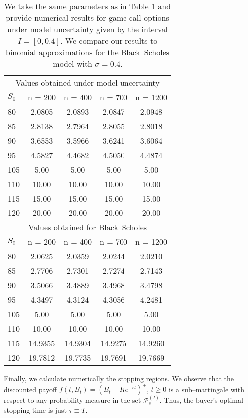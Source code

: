 \documentclass{amsart}
\numberwithin{equation}{section}
\begin{document}
\begin{table}
\begin{center}
\caption{
We take the same parameters as in Table 1
and provide numerical results for game call options under model uncertainty given by the
interval $I=[0,0.4]$. We compare our results to binomial approximations for the Black--Scholes model with $\sigma=0.4$.}
\begin{tabular}{lcccc}
\hline
\multicolumn{5}{c}{Values obtained under model uncertainty }\\
\cline{2-5}
$S_0$ & n = 200 & n = 400 & n = 700 & n = 1200  \\
\hline
80 & 2.0805  & 2.0893 & 2.0847 & 2.0948 \\
85 & 2.8138 & 2.7964 & 2.8055 &  2.8018    \\
90 & 3.6553 & 3.5966 & 3.6241 & 3.6064 \\
95 & 4.5827 & 4.4682 & 4.5050 & 4.4874  \\
105 & 5.00 & 5.00 & 5.00 & 5.00  \\
110 & 10.00 & 10.00 & 10.00 & 10.00 \\
115 & 15.00 & 15.00 & 15.00 & 15.00   \\
120 & 20.00 & 20.00 & 20.00 & 20.00   \\
\hline
\multicolumn{5}{c}{Values obtained for Black--Scholes  }\\
\cline{2-5}
$S_0$ & n = 200 & n = 400 & n = 700 & n = 1200  \\
\hline
80 & 2.0625 & 2.0359 & 2.0244& 2.0210 \\
85 & 2.7706 & 2.7301 & 2.7274 &  2.7143    \\
90 & 3.5066 & 3.4889 & 3.4968 & 3.4798 \\
95 & 4.3497 & 4.3124 & 4.3056 & 4.2481  \\
105 & 5.00 & 5.00 & 5.00 & 5.00  \\
110 & 10.00 & 10.00 & 10.00 & 10.00 \\
115 & 14.9355 & 14.9304 & 14.9275 & 14.9260   \\
120 & 19.7812 & 19.7735 & 19.7691 & 19.7669   \\
\end{tabular}
\end{center}
\end{table}

Finally, we calculate numerically the stopping regions.
We observe that the discounted payoff
$f(t,B_t)=(B_t-Ke^{-rt})^{+}$, $t\geq 0$ is a
sub--martingale with respect to any probability measure
in the set $\mathcal P^{(I)}_s$. Thus, the buyer's optimal stopping time is just
$\tau\equiv T$.
\end{document}
